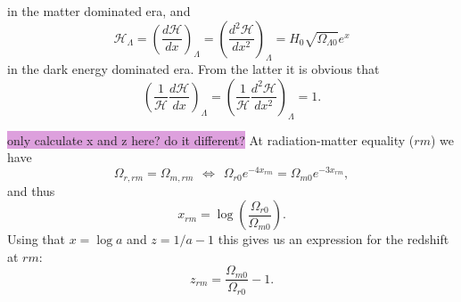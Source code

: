 \documentclass{aa}
\begin{document}
in the matter dominated era, and
\begin{equation}
  \mathcal{H}_\Lambda = \left(\frac{d\mathcal{H}}{dx}\right)_\Lambda = \left(\frac{d^2\mathcal{H}}{dx^2}\right)_\Lambda = H_0\sqrt{\Omega_{\Lambda0}}e^{x}
\end{equation}
in the dark energy dominated era. From the latter it is obvious that
\begin{equation}
  \left(\frac{1}{\mathcal{H}}\frac{d\mathcal{H}}{dx}\right)_\Lambda = \left(\frac{1}{\mathcal{H}}\frac{d^2\mathcal{H}}{dx^2}\right)_\Lambda = 1.
\end{equation} 





\colorbox{Plum}{only calculate x and z here? do it different?}
At radiation-matter equality ($rm$) we have
\begin{equation}
    \Omega_{r,rm} = \Omega_{m,rm} 
    \hspace{5pt}\Leftrightarrow\hspace{5pt} 
    \Omega_{r0}e^{-4x_{rm}} = \Omega_{m0}e^{-3x_{rm}}, 
\end{equation}
and thus
\begin{equation}
  x_{rm} = \log\left(\frac{\Omega_{r0}}{\Omega_{m0}}\right).
\end{equation}
Using that $x = \log a$ and $z = 1/a - 1$ this gives us an expression for the redshift at $rm$:
\begin{equation}
  z_{rm} = \frac{\Omega_{m0}}{\Omega_{r0}} - 1.
\end{equation}
\end{document}
